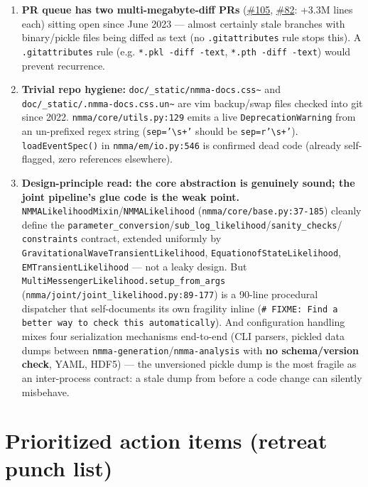\documentclass[10pt]{article}
\newcommand{\code}[1]{\texttt{#1}}
\begin{document}
\begin{enumerate}
\item \textbf{PR queue has two multi-megabyte-diff PRs} (\href{https://github.com/nuclear-multimessenger-astronomy/nmma/issues/105}{\#105}, \href{https://github.com/nuclear-multimessenger-astronomy/nmma/issues/82}{\#82}: +3.3M lines
  each) sitting open since June 2023 --- almost certainly stale branches with
  binary/pickle files being diffed as text (no \code{.gitattributes} rule stops
  this). A \code{.gitattributes} rule (e.g. \code{*.pkl -diff -text},
  \code{*.pth -diff -text}) would prevent recurrence.

\item \textbf{Trivial repo hygiene:} \code{doc/\_static/nmma-docs.css\textasciitilde}
  and \code{doc/\_static/.nmma-docs.css.un\textasciitilde} are vim backup/swap
  files checked into git since 2022. \code{nmma/core/utils.py:129} emits a live
  \code{DeprecationWarning} from an un-prefixed regex string
  (\code{sep='\textbackslash s+'} should be \code{sep=r'\textbackslash s+'}).
  \code{loadEventSpec()} in \code{nmma/em/io.py:546} is confirmed dead code
  (already self-flagged, zero references elsewhere).

\item \textbf{Design-principle read: the core abstraction is genuinely sound; the
  joint pipeline's glue code is the weak point.}
  \code{NMMALikelihoodMixin}/\code{NMMALikelihood} (\code{nmma/core/base.py:37-185})
  cleanly define the
  \code{parameter\_conversion}/\code{sub\_log\_likelihood}/\code{sanity\_checks}/
  \code{constraints} contract, extended uniformly by
  \code{GravitationalWaveTransientLikelihood}, \code{EquationofStateLikelihood},
  \code{EMTransientLikelihood} --- not a leaky design. But
  \code{MultiMessengerLikelihood.setup\_from\_args}
  (\code{nmma/joint/joint\_likelihood.py:89-177}) is a 90-line procedural
  dispatcher that self-documents its own fragility inline
  (\code{\# FIXME: Find a better way to check this automatically}). And
  configuration handling mixes four serialization mechanisms end-to-end (CLI
  parsers, pickled data dumps between \code{nmma-generation}/\code{nmma-analysis}
  with \textbf{no schema/version check}, YAML, HDF5) --- the unversioned pickle
  dump is the most fragile as an inter-process contract: a stale dump from before
  a code change can silently misbehave.
\end{enumerate}

\section{Prioritized action items (retreat punch list)}
\end{document}
